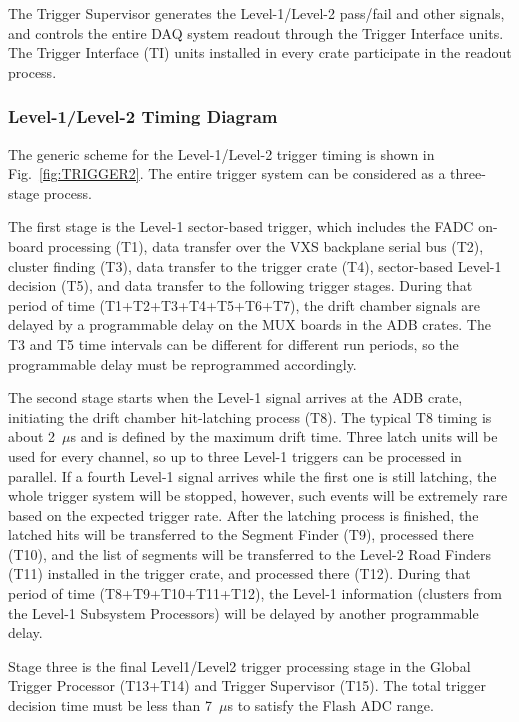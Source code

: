 The Trigger Supervisor generates the Level-1/Level-2 pass/fail and other 
signals, and controls the entire DAQ system readout through the Trigger 
Interface units.  The Trigger Interface (TI) units installed in every 
crate participate in the readout process.

\subsubsection{Level-1/Level-2 Timing Diagram}

The generic scheme for the Level-1/Level-2 trigger timing is shown in 
Fig.~\ref{fig:TRIGGER2}.  The entire trigger system can be considered as a
three-stage process.

The first stage is the Level-1 sector-based trigger, which includes the FADC 
on-board processing (T1), data transfer over the VXS backplane serial bus (T2), 
cluster finding (T3), data transfer to the trigger crate (T4), sector-based 
Level-1 decision (T5), and data transfer to the following trigger stages.  
During that period of time (T1+T2+T3+T4+T5+T6+T7), the drift chamber signals are 
delayed by a programmable delay on the MUX boards in the ADB crates.  The T3 and 
T5 time intervals can be different for different run periods, so the programmable 
delay must be reprogrammed accordingly.

The second stage starts when the Level-1 signal arrives at the ADB crate, 
initiating the drift chamber hit-latching process (T8).  The typical T8 
timing is about 2~$\mu$s and is defined by the maximum drift time.  Three 
latch units will be used for every channel, so up to three Level-1 triggers 
can be processed in parallel.  If a fourth Level-1 signal arrives while 
the first one is still latching, the whole trigger system will be stopped, 
however, such events will be extremely rare based on the expected trigger
rate.  After the latching process is finished, the latched hits will be 
transferred to the Segment Finder (T9), processed there (T10), and the list
of segments will be transferred to the Level-2 Road Finders (T11) installed in 
the trigger crate, and processed there (T12).  During that period of
time (T8+T9+T10+T11+T12), the Level-1 information (clusters from the
Level-1 Subsystem Processors) will be delayed by another programmable delay.

Stage three is the final Level1/Level2 trigger processing stage in the
Global Trigger Processor (T13+T14) and Trigger Supervisor (T15). The
total trigger decision time must be less than 7~$\mu$s to satisfy
the Flash ADC range.

